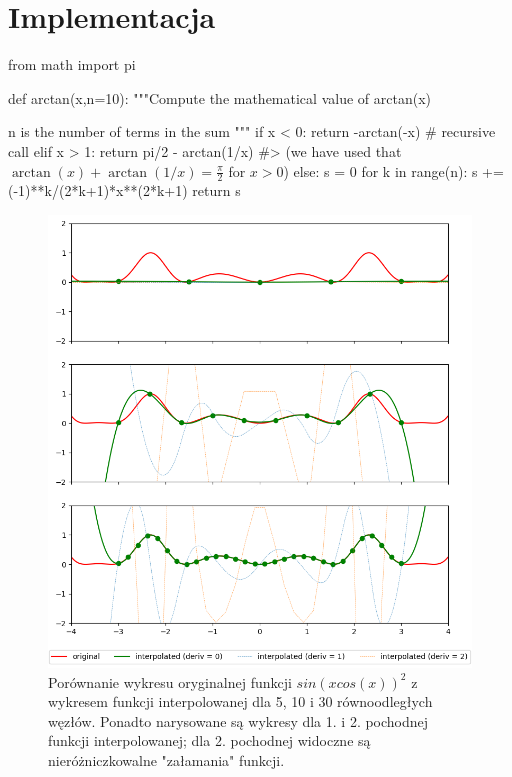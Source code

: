 \documentclass{article}
\begin{document}
\newpage
\section{Implementacja}

\begin{python}
from math import pi

def arctan(x,n=10):
   """Compute the mathematical value of arctan(x)

   n is the number of terms in the sum
   """
    if x < 0:
        return -arctan(-x) # recursive call
    elif x > 1: 
        return pi/2 - arctan(1/x) 
        #> (we have used that $\arctan(x)+\arctan(1/x)=\frac{\pi}{2}$ for $x>0$)
    else: 
        s = 0
        for k in range(n):
            s += (-1)**k/(2*k+1)*x**(2*k+1)
        return s 
\end{python}

\begin{figure}[htbp]
    \center
    \includegraphics[width=1.0\textwidth]{plots_wide.png}
    \caption{Porównanie wykresu oryginalnej funkcji $sin(xcos(x))^2$ z wykresem funkcji interpolowanej dla 5, 10 i 30 równoodległych węzłów. Ponadto narysowane są wykresy dla 1. i 2. pochodnej funkcji interpolowanej; dla 2. pochodnej widoczne są nieróżniczkowalne "załamania" funkcji.}
\end{figure}
\end{document}

